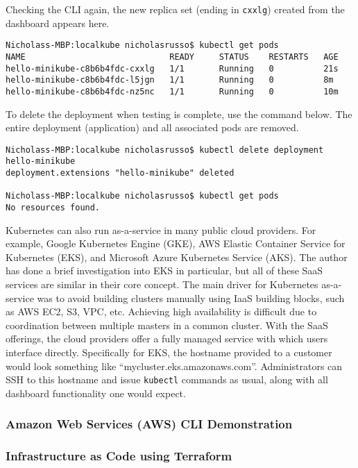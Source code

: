 Checking the CLI again, the new replica set (ending in \verb|cxxlg|) created
from the dashboard appears here.

\begin{verbatim}
Nicholass-MBP:localkube nicholasrusso$ kubectl get pods
NAME                             READY     STATUS    RESTARTS   AGE
hello-minikube-c8b6b4fdc-cxxlg   1/1       Running   0          21s
hello-minikube-c8b6b4fdc-l5jgn   1/1       Running   0          8m
hello-minikube-c8b6b4fdc-nz5nc   1/1       Running   0          10m
\end{verbatim}

To delete the deployment when testing is complete, use the command below. The
entire deployment (application) and all associated pods are removed.

\begin{verbatim}
Nicholass-MBP:localkube nicholasrusso$ kubectl delete deployment hello-minikube
deployment.extensions "hello-minikube" deleted

Nicholass-MBP:localkube nicholasrusso$ kubectl get pods
No resources found.
\end{verbatim}

Kubernetes can also run as-a-service in many public cloud providers. For
example, Google Kubernetes Engine (GKE), AWS Elastic Container Service for
Kubernetes (EKS), and Microsoft Azure Kubernetes Service (AKS). The author has
done a brief investigation into EKS in particular, but all of these SaaS
services are similar in their core concept. The main driver for Kubernetes
as-a-service was to avoid building clusters manually using IaaS building
blocks, such as AWS EC2, S3, VPC, etc. Achieving high availability is
difficult due to coordination between multiple masters in a common cluster.
With the SaaS offerings, the cloud providers offer a fully managed service
with which users interface directly. Specifically for EKS, the hostname
provided to a customer would look something like
``mycluster.eks.amazonaws.com''. Administrators can SSH to this hostname and
issue \verb|kubectl| commands as usual, along with all dashboard functionality
one would expect.

\subsubsection{Amazon Web Services (AWS) CLI Demonstration}
\subsubsection{Infrastructure as Code using Terraform}
